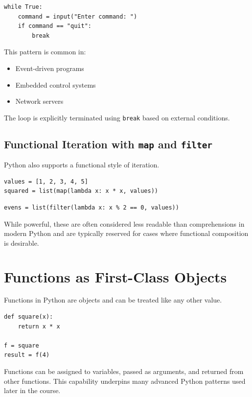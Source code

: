\begin{verbatim}
while True:
    command = input("Enter command: ")
    if command == "quit":
        break
\end{verbatim}

This pattern is common in:
\begin{itemize}
  \item Event-driven programs
  \item Embedded control systems
  \item Network servers
\end{itemize}

The loop is explicitly terminated using \texttt{break} based on external conditions.

\subsection{Functional Iteration with \texttt{map} and \texttt{filter}}

Python also supports a functional style of iteration.

\begin{verbatim}
values = [1, 2, 3, 4, 5]
squared = list(map(lambda x: x * x, values))
\end{verbatim}

\begin{verbatim}
evens = list(filter(lambda x: x % 2 == 0, values))
\end{verbatim}

While powerful, these are often considered less readable than comprehensions in modern Python and are typically reserved for cases where functional composition is desirable.

\section{Functions as First-Class Objects}

Functions in Python are objects and can be treated like any other value.

\begin{verbatim}
def square(x):
    return x * x

f = square
result = f(4)
\end{verbatim}

Functions can be assigned to variables, passed as arguments, and returned from other functions. This capability underpins many advanced Python patterns used later in the course.

